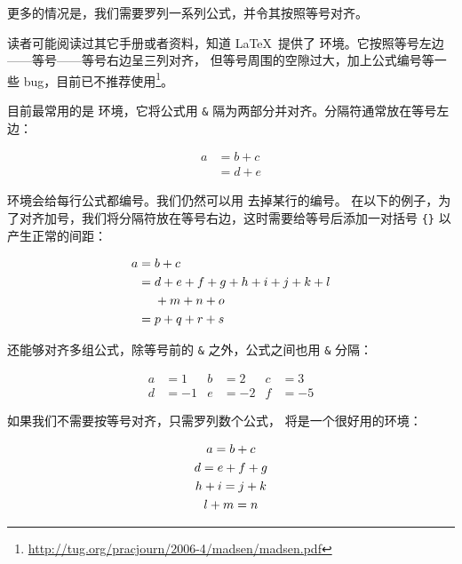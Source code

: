 更多的情况是，我们需要罗列一系列公式，并令其按照等号对齐。

读者可能阅读过其它手册或者资料，知道 \LaTeX\ 提供了  环境。它按照等号左边——等号——等号右边呈三列对齐，
但等号周围的空隙过大，加上公式编号等一些 bug，目前已不推荐使用\footnote{\url{http://tug.org/pracjourn/2006-4/madsen/madsen.pdf}}。

目前最常用的是  环境，它将公式用 \texttt\& 隔为两部分并对齐。分隔符通常放在等号左边：
\begin{example}
\begin{align}
a & = b + c \\
& = d + e
\end{align}
\end{example}

 环境会给每行公式都编号。我们仍然可以用  去掉某行的编号。
在以下的例子，为了对齐加号，我们将分隔符放在等号右边，这时需要给等号后添加一对括号 \texttt\{\texttt\} 以产生正常的间距：
\begin{example}
\begin{align}
a ={} & b + c \\
  ={} & d + e + f + g + h + i
        + j + k + l \notag \\
      & + m + n + o \\
  ={} & p + q + r + s
\end{align}
\end{example}

 还能够对齐多组公式，除等号前的 \texttt\& 之外，公式之间也用 \texttt\& 分隔：
\begin{example}
\begin{align}
a &=1  &  b &=2   & c &=3   \\
d &=-1 &  e &=-2  & f &=-5 
\end{align}
\end{example}

如果我们不需要按等号对齐，只需罗列数个公式， 将是一个很好用的环境：
\begin{example}
\begin{gather}
a = b + c \\
d = e + f + g \\
h + i = j + k \notag \\
l + m = n
\end{gather}
\end{example}

